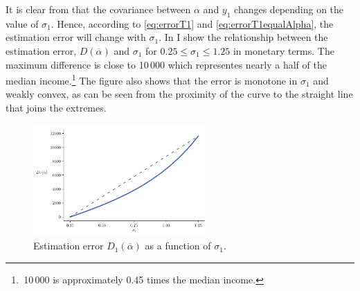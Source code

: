 \documentclass[english, a4paper, 12pt]{article}
\begin{document}
It is clear from  that the covariance between $\alpha$ and $y_{1}$ changes depending on the value of $\sigma_{1}$. Hence, according to \eqref{eq:errorT1} and \eqref{eq:errorT1equalAlpha}, the estimation error will change with $\sigma_{1}$. In  I show the relationship between the estimation error, $D(\overline{\alpha})$ and $\sigma_{1}$ for $0.25 \leq \sigma_{1} \leq 1.25$ in monetary terms. The maximum difference is close to 10\,000 which representes nearly a half of the median income.\footnote{\,10\,000 is approximately 0.45 times the median income.} The figure also shows that the error is monotone in $\sigma_{1}$ and weakly convex, as can be seen from the proximity of the curve to the straight line that joins the extremes. 
	\begin{figure}
		\caption{Estimation error $D_{1}(\overline{\alpha})$ as a function of $\sigma_{1}$.}
		\label{fig:RADiffPlot}
		\includegraphics[width = 0.6\textwidth]{RAdiffPlot}
	\end{figure}
	
\end{document}

